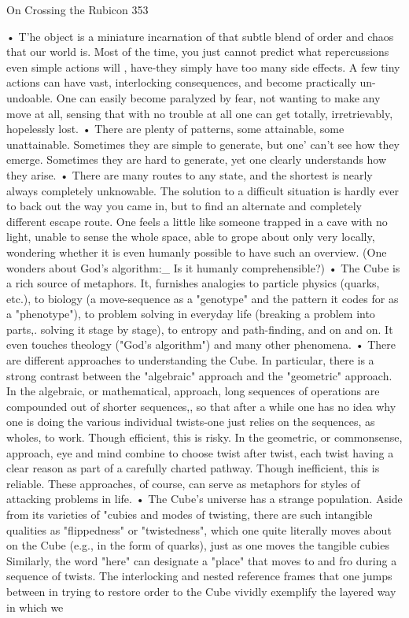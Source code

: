 On Crossing the Rubicon                                                               353

        • T'he object is a miniature incarnation of that subtle blend of order and
chaos that our world is. Most of the time, you just cannot predict what
repercussions even simple actions will , have-they simply have too many side
effects. A few tiny actions can have vast, interlocking consequences, and become
practically un-undoable. One can easily become paralyzed by fear, not wanting to
make any move at all, sensing that with no trouble at all one can get totally,
irretrievably, hopelessly lost.
        • There are plenty of patterns, some attainable, some unattainable.
Sometimes they are simple to generate, but one' can't see how they emerge.
Sometimes they are hard to generate, yet one clearly understands how they arise.
        • There are many routes to any state, and the shortest is nearly always
completely unknowable. The solution to a difficult situation is hardly ever to back
out the way you came in, but to find an alternate and completely different escape
route. One feels a little like someone trapped in a cave with no light, unable to
sense the whole space, able to grope about only very locally, wondering whether it
is even humanly possible to have such an overview. (One wonders about God's
algorithm:\_ Is it humanly comprehensible?)
        • The Cube is a rich source of metaphors. It, furnishes analogies to particle
physics (quarks, etc.), to biology (a move-sequence as a "genotype" and the pattern
it codes for as a "phenotype"), to problem solving in everyday life (breaking a
problem into parts,. solving it stage by stage), to entropy and path-finding, and on
and on. It even touches theology ("God's algorithm") and many other phenomena.
        • There are different approaches to understanding the Cube. In particular,
there is a strong contrast between the "algebraic" approach and the "geometric"
approach. In the algebraic, or mathematical, approach, long sequences of
operations are compounded out of shorter sequences,, so that after a while one has
no idea why one is doing the various individual twists-one just relies on the
sequences, as wholes, to work. Though efficient, this is risky. In the geometric, or
commonsense, approach, eye and mind combine to choose twist after twist, each
twist having a clear reason as part of a carefully charted pathway. Though
inefficient, this is reliable. These approaches, of course, can serve as metaphors for
styles of attacking problems in life.
        • The Cube's universe has a strange population. Aside from its varieties of
"cubies and modes of twisting, there are such intangible qualities as "flippedness"
or "twistedness", which one quite literally moves about on the Cube (e.g., in the
form of quarks), just as one moves the tangible cubies Similarly, the word "here"
can designate a "place" that moves to and fro during a sequence of twists. The
interlocking and nested reference frames that one jumps between in trying to
restore order to the Cube vividly exemplify the layered way in which we




